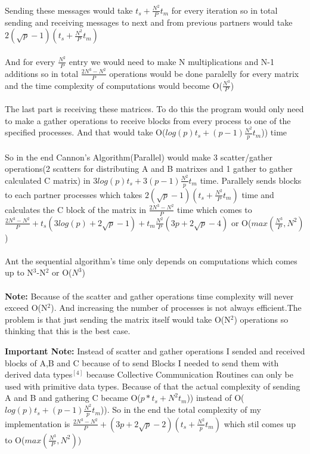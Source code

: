 \\
Sending these messages would take $t_s+\frac{N^2}{P}t_m$ for every iteration so in total sending and receiving messages to next and from previous partners would take $2(\sqrt{p}-1)(t_s+\frac{N^2}{P}t_m)$\\
\\
And for every $\frac{N^2}{P}$ entry we would need to make N multiplications and N-1 additions so in total $\frac{2N^3-N^2}{P}$ operations would be done paralelly for every matrix and the time complexity of computations would become O($\frac{N^3}{P}$)\\
\\
The last part is receiving these matrices. To do this the program would only need to make a gather operations to receive blocks from every process to one of the specified processes. And that would take O(\(log(p)t_s+(p-1)\frac{N^2}{p}t_m\))) time\\
\\
So in the end Cannon's Algorithm(Parallel) would make 3 scatter/gather operations(2 scatters for distributing A and B matrixes and 1 gather to gather calculated C matrix) in \(3log(p)t_s+3(p-1)\frac{N^2}{p}t_m\) time. Parallely sends blocks to each partner processes which takes $2(\sqrt{p}-1)(t_s+\frac{N^2}{P}t_m)$ time and calculates the C block of the matrix in $\frac{2N^3-N^2}{P}$ time which comes to \(\frac{2N^3-N^2}{P}+t_s(3log(p)+2\sqrt{p}-1)+t_m\frac{N^2}{P}(3p+2\sqrt{p}-4)\) or O(\(max(\frac{N^3}{P},N^2)\))\\
\\
Ant the sequential algorithm's time only depends on computations which comes up to N$^3$-N$^2$ or O($N^3$)\\
\\
\textbf{Note:} Because of the scatter and gather operations time complexity will never exceed O(N$^2$). And increasing the number of processes is not always efficient.The problem is that just sending the matrix itself would take O(N$^2$) operations so thinking that this is the best case.

\textbf{Important Note:} Instead of scatter and gather operations I sended and received blocks of A,B and C because of to send Blocks I needed to send them with derived data types$^{[4]}$ because Collective Communication Routines can only be used with primitive data types. Because of that the actual complexity of sending A and B and gathering C became O(\(p*t_s+N^2t_m\))) instead of O(\(log(p)t_s+(p-1)\frac{N^2}{p}t_m\))). So in the end the total complexity of my implementation is \(\frac{2N^3-N^2}{P}+(3p+2\sqrt{p}-2)(t_s+\frac{N^2}{p}t_m)\) which stil comes up to O(\(max(\frac{N^3}{P},N^2)\))